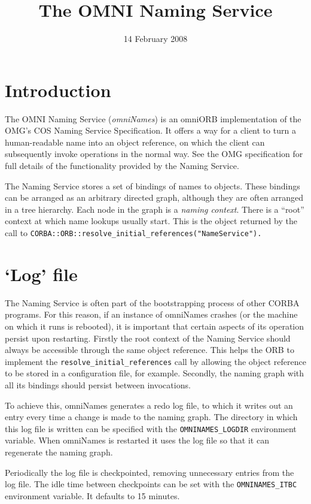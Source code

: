 \documentclass[a4paper,11pt,twoside]{article}
\title{The OMNI Naming Service}
\date{14 February 2008}
\begin{document}
\maketitle

\section{Introduction}

The OMNI Naming Service (\emph{omniNames}) is an omniORB
implementation of the OMG's COS Naming Service Specification.  It
offers a way for a client to turn a human-readable name into an object
reference, on which the client can subsequently invoke operations in
the normal way.  See the OMG specification for full details of the
functionality provided by the Naming Service.

The Naming Service stores a set of bindings of names to objects.
These bindings can be arranged as an arbitrary directed graph,
although they are often arranged in a tree hierarchy.  Each node in
the graph is a \emph{naming context}.  There is a ``root'' context at
which name lookups usually start.  This is the object returned by the
call to \verb|CORBA::ORB::resolve_initial_references("NameService").|


\section{`Log' file}

The Naming Service is often part of the bootstrapping process of other
CORBA programs.  For this reason, if an instance of omniNames crashes
(or the machine on which it runs is rebooted), it is important that
certain aspects of its operation persist upon restarting.  Firstly the
root context of the Naming Service should always be accessible through
the same object reference.  This helps the ORB to implement the
\verb|resolve_initial_references| call by allowing the object
reference to be stored in a configuration file, for example.
Secondly, the naming graph with all its bindings should persist
between invocations.

To achieve this, omniNames generates a redo log file, to which it
writes out an entry every time a change is made to the naming graph.
The directory in which this log file is written can be specified with
the \verb|OMNINAMES_LOGDIR| environment variable.  When omniNames is
restarted it uses the log file so that it can regenerate the naming
graph.

Periodically the log file is checkpointed, removing unnecessary
entries from the log file.  The idle time between checkpoints can be
set with the \verb|OMNINAMES_ITBC| environment variable.  It defaults
to 15 minutes.
\end{document}
